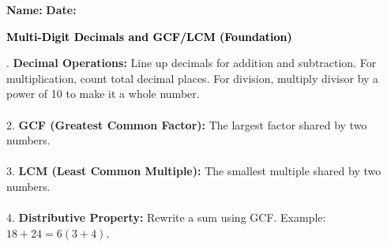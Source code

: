 \documentclass[12pt, letterpaper, fleqn]{article}
\begin{document}
\textbf{Name:} \underline{\hspace{5cm}}
\hfill
\textbf{Date:} \underline{\hspace{3cm}}\\

\begin{tcolorbox}[colback=black!10]
    \large\textcolor{black}{\textbf{Multi-Digit Decimals and GCF/LCM (Foundation)}}
\end{tcolorbox}

\vspace{3mm}

. \textbf{Decimal Operations:} Line up decimals for addition and subtraction. For multiplication, count total decimal places. For division, multiply divisor by a power of 10 to make it a whole number. \\ \\
2. \textbf{GCF (Greatest Common Factor):} The largest factor shared by two numbers. \\ \\
3. \textbf{LCM (Least Common Multiple):} The smallest multiple shared by two numbers. \\ \\
4. \textbf{Distributive Property:} Rewrite a sum using GCF. Example: $18 + 24 = 6(3 + 4)$. \\
\end{document}
